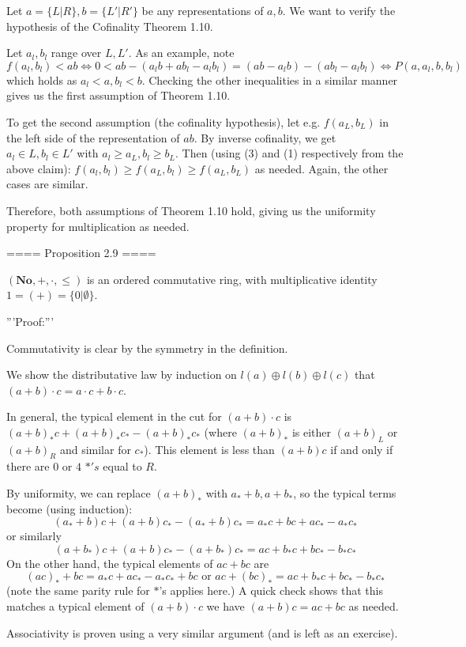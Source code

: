 Let $a = \{L|R\}, b = \{L'|R'\}$ be any representations of $a,b$. We want to verify the hypothesis of the Cofinality Theorem 1.10.

Let $a_l, b_l$ range over $L,L'$. As an example, note
\[
f(a_l, b_l) < ab \Leftrightarrow 0 < ab - (a_lb + ab_l - a_lb_l) = (ab - a_lb) - (ab_l - a_lb_l)
\Leftrightarrow P(a,a_l,b,b_l)
\]
which holds as $a_l<a, b_l<b$. Checking the other inequalities in a similar manner gives us the first assumption of Theorem 1.10.

To get the second assumption (the cofinality hypothesis), let e.g. $f(a_L,b_L)$ in the left side of the representation of $ab$. By inverse cofinality, we get $a_l\in L, b_l\in L'$ with $a_l \geq a_L, b_l\geq b_L$.
Then (using (3) and (1) respectively from the above claim): $f(a_l,b_l) \geq f(a_L,b_l)\geq f(a_L,b_L)$ as needed. Again, the other cases are similar.

Therefore, both assumptions of Theorem 1.10 hold, giving us the uniformity property for multiplication as needed.

==== Proposition 2.9 ====

$(\mathbf{No},+,\cdot,\leq)$ is an ordered commutative ring, with multiplicative identity $1 = (+) = \{0 | \emptyset \}$.

'''Proof:'''

Commutativity is clear by the symmetry in the definition.

We show the distributative law by induction on $l(a) \oplus l(b) \oplus l(c)$ that $(a+b)\cdot c = a\cdot c + b\cdot c$.

In general, the typical element in the cut for $(a+b)\cdot c$ is $(a+b)_* c + (a+b)_* c_* - (a+b)_*c_*$ (where $(a+b)_*$ is either $(a+b)_L$ or $(a+b)_R$ and similar for $c_*$). This element is less than $(a+b)c$ if and only if there are $0$ or $4$ $*'s$ equal to $R$.

By uniformity, we can replace $(a+b)_*$ with $a_*+b,a+b_*$, so the typical terms become (using induction):
\[
(a_*+b)c + (a+b)c_* - (a_*+b)c_* = a_*c + bc + ac_* - a_*c_*
\]
or similarly
\[
(a+b_*)c + (a+b)c_* - (a+b_*)c_* = ac + b_*c + bc_* - b_*c_*
\]
On the other hand, the typical elements of $ac + bc$ are
\[
(ac)_* + bc = a_*c + ac_* - a_*c_* + bc \text{ or } ac + (bc)_* = ac + b_*c + bc_* - b_*c_*
\]
(note the same parity rule for $*$'s applies here.) A quick check shows that this matches a typical element of $(a+b)\cdot c$ we have $(a+b)c = ac+bc$ as needed.

Associativity is proven using a very similar argument (and is left as an exercise).

